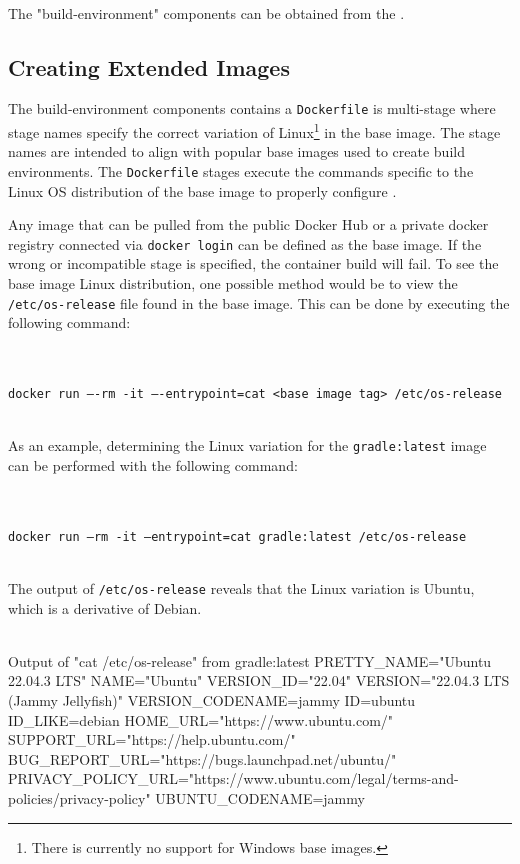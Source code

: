 \noindent\\The "build-environment" components can be obtained from the .


\subsection{Creating Extended Images}

The build-environment components contains a \texttt{Dockerfile} is multi-stage where stage names
specify the correct variation of Linux\footnote{There is currently no support for Windows base images.}
in the base image.  The stage names are intended to align 
with popular base images used to create build environments.  The \texttt{Dockerfile} stages
execute the commands specific to the Linux OS distribution of the base image to properly configure
\scaresolver.

Any image that can be pulled from the public Docker Hub or a private docker registry connected via 
\texttt{docker login} can be defined as the base image.  If the wrong or incompatible stage is specified, 
the container build will fail. To see the base image Linux distribution, one possible method would be
to view the \texttt{/etc/os-release} file found in the base image.  This can be done by executing the following
command:

\noindent\\\\\texttt{docker run ----rm -it ----entrypoint=cat <base image tag> /etc/os-release}


\noindent\\As an example, determining the Linux variation for the \texttt{gradle:latest} image can
be performed with the following command:

\noindent\\\\\texttt{docker run --rm -it --entrypoint=cat gradle:latest /etc/os-release}

\noindent\\The output of \texttt{/etc/os-release} reveals that the Linux variation is Ubuntu, which is a derivative
of Debian.\\\\

\begin{code}{Output of "cat /etc/os-release" from gradle:latest}{}{}
PRETTY_NAME="Ubuntu 22.04.3 LTS"
NAME="Ubuntu"
VERSION_ID="22.04"
VERSION="22.04.3 LTS (Jammy Jellyfish)"
VERSION_CODENAME=jammy
ID=ubuntu
ID_LIKE=debian
HOME_URL="https://www.ubuntu.com/"
SUPPORT_URL="https://help.ubuntu.com/"
BUG_REPORT_URL="https://bugs.launchpad.net/ubuntu/"
PRIVACY_POLICY_URL="https://www.ubuntu.com/legal/terms-and-policies/privacy-policy"
UBUNTU_CODENAME=jammy
\end{code}



